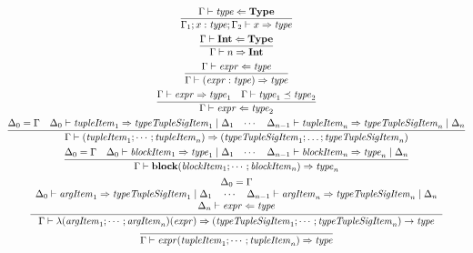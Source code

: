 \begin{gather*}
  \infer{\Gamma_1; x: \mathit{type}; \Gamma_2 \vdash x \Rightarrow \mathit{type}}{
    \Gamma \vdash \mathit{type} \Leftarrow \mathbf{Type}
  }
  \\
  \infer{\Gamma \vdash n \Rightarrow \mathbf{Int}}{
    \Gamma \vdash \mathbf{Int} \Leftarrow \mathbf{Type}
  }
  \\
  \infer{\Gamma \vdash (\mathit{expr}: \mathit{type}) \Rightarrow \mathit{type}}{
    \Gamma \vdash \mathit{expr} \Leftarrow \mathit{type}
  }
  \\
  \infer{\Gamma \vdash \mathit{expr} \Leftarrow \mathit{type}_2}{
    \Gamma \vdash \mathit{expr} \Rightarrow \mathit{type}_1
    &
    \Gamma \vdash \mathit{type}_1 \preceq \mathit{type}_2
  }
  \\
  \infer{\Gamma \vdash (\mathit{tupleItem}_1; \cdots; \mathit{tupleItem}_n) \Rightarrow (\mathit{typeTupleSigItem}_1; \ldots; \mathit{typeTupleSigItem}_n)}{
    \Delta_0 = \Gamma
    &
    \Delta_0 \vdash \mathit{tupleItem}_1 \Rightarrow \mathit{typeTupleSigItem}_1 \mid \Delta_1
    &
    \cdots
    &
    \Delta_{n - 1} \vdash \mathit{tupleItem}_n \Rightarrow \mathit{typeTupleSigItem}_n \mid \Delta_n
  }
  \\
  \infer{\Gamma \vdash \mathbf{block}(\mathit{blockItem}_1; \cdots; \mathit{blockItem}_n) \Rightarrow \mathit{type}_n}{
    \Delta_0 = \Gamma
    &
    \Delta_0 \vdash \mathit{blockItem}_1 \Rightarrow \mathit{type}_1 \mid \Delta_1
    &
    \cdots
    &
    \Delta_{n - 1} \vdash \mathit{blockItem}_n \Rightarrow \mathit{type}_n \mid \Delta_n
  }
  \\
  \infer{\Gamma \vdash \lambda(\mathit{argItem}_1; \cdots; \mathit{argItem}_n)(\mathit{expr}) \Rightarrow (\mathit{typeTupleSigItem}_1; \cdots; \mathit{typeTupleSigItem}_n) \rightarrow \mathit{type}}{
    \begin{array}{c}
      \Delta_0 = \Gamma
      \\
      \Delta_0 \vdash \mathit{argItem}_1 \Rightarrow \mathit{typeTupleSigItem}_1 \mid \Delta_1
      \hspace{1em}
      \cdots
      \hspace{1em}
      \Delta_{n - 1} \vdash \mathit{argItem}_n \Rightarrow \mathit{typeTupleSigItem}_n \mid \Delta_n
      \\
      \Delta_n \vdash \mathit{expr} \Leftarrow \mathit{type}
    \end{array}
  }
  \\
  \infer{\Gamma \vdash \mathit{expr}(\mathit{tupleItem}_1; \cdots; \mathit{tupleItem}_n) \Rightarrow \mathit{type}}{
}
\end{gather*}
